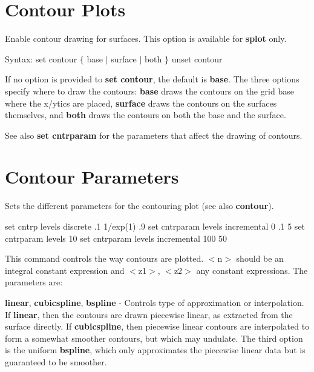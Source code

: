 \section{Contour Plots}
Enable contour drawing for surfaces. This option is available for {\bf splot}
only.

Syntax:
        set contour $\{$ base $|$ surface $|$ both $\}$
        unset contour

If no option is provided to {\bf set contour}, the default is {\bf base}.
The three options specify where to draw the contours: {\bf base} draws
the contours on the grid base where the x/ytics are placed, {\bf surface}
draws the contours on the surfaces themselves, and {\bf both} draws the
contours on both the base and the surface.

See also {\bf set cntrparam} for the parameters that affect the drawing of
contours.

\section{Contour Parameters}
Sets the different parameters for the contouring plot (see also {\bf contour}).


        {set cntrp levels discrete .1 1/exp(1) .9}
        {set cntrparam levels incremental  0 .1 5 }
        {set cntrparam levels 10 }
        {set cntrparam levels incremental 100 50}

This command controls the way contours are plotted. $<$n$>$ should be an
integral constant expression and $<$z1$>$, $<$z2$>$ any constant expressions.
The parameters are:

{\bf linear}, {\bf cubicspline}, {\bf bspline} - Controls type of approximation or
interpolation. If {\bf linear}, then the contours are drawn piecewise
linear, as extracted from the surface directly. If {\bf cubicspline}, then
piecewise linear contours are interpolated to form a somewhat smoother
contours, but which may undulate. The third option is the uniform
{\bf bspline}, which only approximates the piecewise linear data but is
guaranteed to be smoother.

